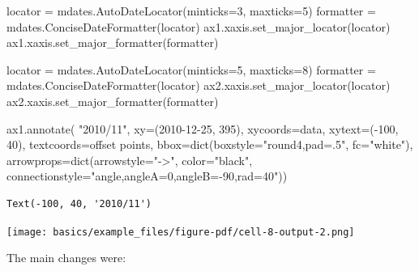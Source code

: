 \documentclass[
  letterpaper,
  DIV=11,
  numbers=noendperiod]{scrreprt}
\newenvironment{Shaded}{\begin{snugshade}}{\end{snugshade}}
\newcommand{\BuiltInTok}[1]{\textcolor[rgb]{0.00,0.23,0.31}{#1}}
\newcommand{\DecValTok}[1]{\textcolor[rgb]{0.68,0.00,0.00}{#1}}
\newcommand{\NormalTok}[1]{\textcolor[rgb]{0.00,0.23,0.31}{#1}}
\newcommand{\OperatorTok}[1]{\textcolor[rgb]{0.37,0.37,0.37}{#1}}
\newcommand{\StringTok}[1]{\textcolor[rgb]{0.13,0.47,0.30}{#1}}
\begin{document}
\begin{Shaded}
\begin{Highlighting}[]
\NormalTok{locator }\OperatorTok{=}\NormalTok{ mdates.AutoDateLocator(minticks}\OperatorTok{=}\DecValTok{3}\NormalTok{, maxticks}\OperatorTok{=}\DecValTok{5}\NormalTok{)}
\NormalTok{formatter }\OperatorTok{=}\NormalTok{ mdates.ConciseDateFormatter(locator)}
\NormalTok{ax1.xaxis.set\_major\_locator(locator)}
\NormalTok{ax1.xaxis.set\_major\_formatter(formatter)}

\NormalTok{locator }\OperatorTok{=}\NormalTok{ mdates.AutoDateLocator(minticks}\OperatorTok{=}\DecValTok{5}\NormalTok{, maxticks}\OperatorTok{=}\DecValTok{8}\NormalTok{)}
\NormalTok{formatter }\OperatorTok{=}\NormalTok{ mdates.ConciseDateFormatter(locator)}
\NormalTok{ax2.xaxis.set\_major\_locator(locator)}
\NormalTok{ax2.xaxis.set\_major\_formatter(formatter)}

\NormalTok{ax1.annotate(}
    \StringTok{"2010/11"}\NormalTok{,}
\NormalTok{    xy}\OperatorTok{=}\NormalTok{(}\StringTok{\textquotesingle{}2010{-}12{-}25\textquotesingle{}}\NormalTok{, }\DecValTok{395}\NormalTok{),  xycoords}\OperatorTok{=}\StringTok{\textquotesingle{}data\textquotesingle{}}\NormalTok{,}
\NormalTok{    xytext}\OperatorTok{=}\NormalTok{(}\OperatorTok{{-}}\DecValTok{100}\NormalTok{, }\DecValTok{40}\NormalTok{), textcoords}\OperatorTok{=}\StringTok{\textquotesingle{}offset points\textquotesingle{}}\NormalTok{,}
\NormalTok{    bbox}\OperatorTok{=}\BuiltInTok{dict}\NormalTok{(boxstyle}\OperatorTok{=}\StringTok{"round4,pad=.5"}\NormalTok{, fc}\OperatorTok{=}\StringTok{"white"}\NormalTok{),}
\NormalTok{    arrowprops}\OperatorTok{=}\BuiltInTok{dict}\NormalTok{(arrowstyle}\OperatorTok{=}\StringTok{"{-}\textgreater{}"}\NormalTok{,}
\NormalTok{                    color}\OperatorTok{=}\StringTok{"black"}\NormalTok{,}
\NormalTok{                    connectionstyle}\OperatorTok{=}\StringTok{"angle,angleA=0,angleB={-}90,rad=40"}\NormalTok{))}
\end{Highlighting}
\end{Shaded}

\begin{verbatim}
Text(-100, 40, '2010/11')
\end{verbatim}

\texttt{[image: basics/example\_files/figure-pdf/cell-8-output-2.png]}

The main changes were:
\end{document}
